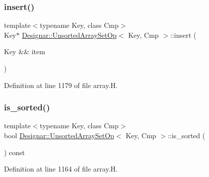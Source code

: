 \subsubsection{\texorpdfstring{insert()}{insert()}\hspace{0.1cm}{\footnotesize\ttfamily [2/2]}}
{\footnotesize\ttfamily template$<$typename Key, class Cmp$>$ \\
Key$\ast$ \hyperlink{class_designar_1_1_unsorted_array_set_op}{Designar\+::\+Unsorted\+Array\+Set\+Op}$<$ Key, Cmp $>$\+::insert (\begin{DoxyParamCaption}\item[{Key \&\&}]{item }\end{DoxyParamCaption})\hspace{0.3cm}{\ttfamily [inline]}}



Definition at line 1179 of file array.\+H.

\mbox{\label{class_designar_1_1_unsorted_array_set_op_afc0e1e303afc39e67727d985a0eb122e}} 
\subsubsection{\texorpdfstring{is\+\_\+sorted()}{is\_sorted()}}
{\footnotesize\ttfamily template$<$typename Key, class Cmp$>$ \\
bool \hyperlink{class_designar_1_1_unsorted_array_set_op}{Designar\+::\+Unsorted\+Array\+Set\+Op}$<$ Key, Cmp $>$\+::is\+\_\+sorted (\begin{DoxyParamCaption}{ }\end{DoxyParamCaption}) const\hspace{0.3cm}{\ttfamily [inline]}}



Definition at line 1164 of file array.\+H.

\mbox{\label{class_designar_1_1_unsorted_array_set_op_aed07acdf2c6e94cbe1392e78f9484c2a}} 
